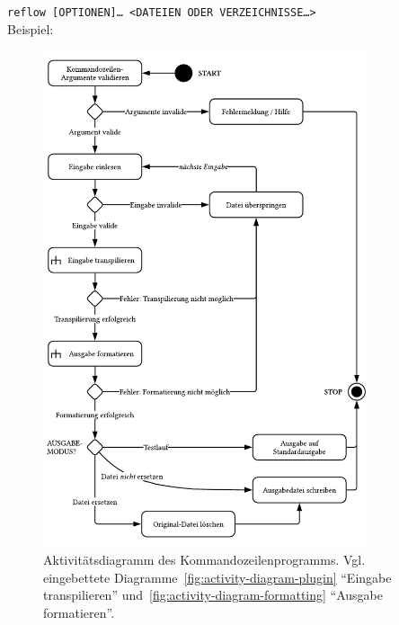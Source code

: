 {{
  \small
  \texttt{reflow [OPTIONEN]… <DATEIEN ODER VERZEICHNISSE…>}\\
  Beispiel: 
}

\medbreak


\begin{figure}[tbp]
  \centering
  \includegraphics[width=0.85\textwidth]{src/4_Umsetzung/fig/activity-diagram-cli.pdf}
  \caption[Aktivitätsdiagramm des Kommandozeilenprogramms]{Aktivitätsdiagramm des Kommandozeilenprogramms. Vgl. eingebettete Diagramme~\ref{fig:activity-diagram-plugin} \enquote{Eingabe transpilieren} und~\ref{fig:activity-diagram-formatting} \enquote{Ausgabe formatieren}.}
  \label{fig:activity-diagram-cli}
\end{figure}

}
